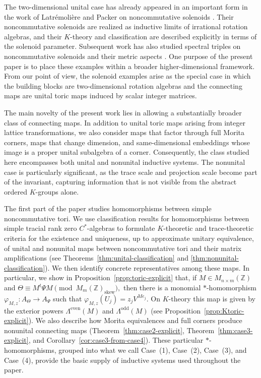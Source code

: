 \documentclass[11pt]{amsart}
\theoremstyle{definition}
\theoremstyle{remark}
\newcommand{\Z}{\mathbb{Z}}
\begin{document}
The two-dimensional unital case has already appeared in an important form in
the work of Latr\'emoli\`ere and Packer on noncommutative solenoids
\cite{LatPackSol}.  Their noncommutative solenoids are realized as inductive
limits of irrational rotation algebras, and their $K$-theory and classification
are described explicitly in terms of the solenoid parameter.  Subsequent work
has also studied spectral triples on noncommutative solenoids and their metric
aspects
\cite{FarsiLandryLarsenPackerSolenoids,FarsiLatremolierePackerStandardSolenoids}.
One purpose of the present paper is to place these examples within a broader
higher-dimensional framework.  From our point of view, the solenoid examples
arise as the special case in which the building blocks are two-dimensional
rotation algebras and the connecting maps are unital toric maps induced by
scalar integer matrices.

The main novelty of the present work lies in allowing a substantially broader class of connecting maps. In addition to unital toric maps arising from integer lattice transformations, we also consider maps that factor through full Morita corners, maps that change dimension, and same-dimensional embeddings whose image is a proper unital subalgebra of a corner. Consequently, the class studied here encompasses both unital and nonunital inductive systems. The nonunital case is particularly significant, as the trace scale and projection scale become part of the invariant, capturing information that is not visible from the abstract ordered $K$-groups alone.

The first part of the paper studies homomorphisms between simple
noncommutative tori.  We use classification results for homomorphisms between
simple tracial rank zero $C^*$-algebras \cite{LinHom, LinRange}  to formulate $K$-theoretic and
trace-theoretic criteria for the existence and uniqueness, up to approximate
unitary equivalence, of unital and nonunital maps between noncommutative tori
and their matrix amplifications (see Theorems~\ref{thm:unital-classification} and \ref{thm:nonunital-classification}).  We then identify concrete representatives
among these maps.  In particular, we show in Proposition~\ref{prop:toric-explicit} that, if $M\in M_{n\times m}(\Z)$ and $\Theta\equiv M^t\Psi M \pmod{M_m(\Z)_{\mathrm{skew}}},$
then there is a monomial $*$-homomorphism $\varphi_{M,z}\colon A_\Theta\longrightarrow A_\Psi$ such that 
$\varphi_{M,z}(U_j)=z_jV^{Me_j}.$
On $K$-theory this map is given by the exterior powers
$\Lambda^{\mathrm{even}}(M)$ and $\Lambda^{\mathrm{odd}}(M)$ (see Proposition~\ref{prop:Ktoric-explicit}).  We also
describe how Morita equivalences and full corners produce nonunital connecting
maps (Theorem~\ref{thm:case2-explicit}, Theorem~\ref{thm:case3-explicit}, and Corollary~\ref{cor:case3-from-case4}). These particular $*$-homomorphisms, grouped into what we call Case~(1), Case~(2), Case~(3), and Case~(4), provide the basic supply of inductive systems used throughout the paper.
\end{document}
